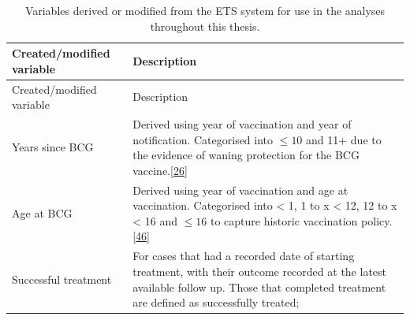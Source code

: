 \documentclass[11pt,twoside]{bristolthesis}
\begin{document}
  \begin{longtable}[]{@{}ll@{}}
  \caption{\label{tab:created-var} Variables derived or modified from the ETS system for use in the analyses throughout this thesis.}\tabularnewline
  \toprule
  \begin{minipage}[b]{0.33\columnwidth}\raggedright
  Created/modified variable\strut
  \end{minipage} & \begin{minipage}[b]{0.62\columnwidth}\raggedright
  Description\strut
  \end{minipage}\tabularnewline
  \midrule
  \endfirsthead
  \toprule
  \begin{minipage}[b]{0.33\columnwidth}\raggedright
  Created/modified variable\strut
  \end{minipage} & \begin{minipage}[b]{0.62\columnwidth}\raggedright
  Description\strut
  \end{minipage}\tabularnewline
  \midrule
  \endhead
  \begin{minipage}[t]{0.33\columnwidth}\raggedright
  Years since BCG\strut
  \end{minipage} & \begin{minipage}[t]{0.62\columnwidth}\raggedright
  Derived using year of vaccination and year of
  notification. Categorised into \(\leq 10\) and 11+
  due to the evidence of waning protection for the
  BCG vaccine.{[}\protect\hyperlink{ref-Abubakar2013}{26}{]}\strut
  \end{minipage}\tabularnewline
  \begin{minipage}[t]{0.33\columnwidth}\raggedright
  Age at BCG\strut
  \end{minipage} & \begin{minipage}[t]{0.62\columnwidth}\raggedright
  Derived using year of vaccination and age at
  vaccination. Categorised into \textless{} 1, 1 to x \textless{} 12, 12
  to x \textless{} 16 and \(\leq 16\) to capture historic
  vaccination policy.{[}\protect\hyperlink{ref-PublicHealthEngland2011a}{46}{]}\strut
  \end{minipage}\tabularnewline
  \begin{minipage}[t]{0.33\columnwidth}\raggedright
  Successful treatment\strut
  \end{minipage} & \begin{minipage}[t]{0.62\columnwidth}\raggedright
  For cases that had a recorded date of starting
  treatment, with their outcome recorded at the
  latest available follow up. Those that completed
  treatment are defined as successfully treated;

\end{minipage}
\end{longtable}
\end{document}
